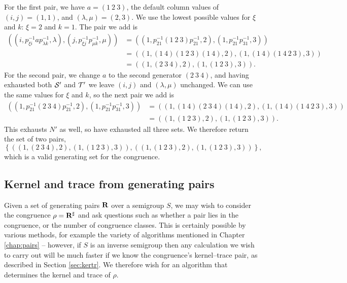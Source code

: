 \begin{example}
  For the first pair, we have $a = (1~2~3)$, the default column values of
  $(i,j)=(1,1)$, and $(\lambda,\mu)=(2,3)$.  We use the lowest possible values
  for $\xi$ and $k$: $\xi = 2$ and $k = 1$.  The pair we add is
  \begin{align*}
    \left(
      (i, p_{\xi i}^{-1}ap_{\lambda k}^{-1}, \lambda),
      (j, p_{\xi j}^{-1}p_{\mu k}^{-1}, \mu)
    \right)
    &= \left(
      (1, p_{2 1}^{-1}(1~2~3)p_{2 1}^{-1}, 2),
      (1, p_{2 1}^{-1}p_{3 1}^{-1}, 3)
    \right) \\
    &= \left(
      \left(1, (1~4)(1~2~3)(1~4), 2\right),
      \left(1, (1~4)(1~4~2~3), 3\right)
    \right) \\
    &= \left(
      \left(1, (2~3~4), 2\right),
      \left(1, (1~2~3), 3\right)
    \right).
  \end{align*}
  For the second pair, we change $a$ to the second generator $(2~3~4)$, and
  having exhausted both $\mathcal{S}'$ and $\mathcal{T}'$ we leave $(i,j)$ and $(\lambda,\mu)$
  unchanged.  We can use the same values for $\xi$ and $k$, so the next pair we
  add is
  \begin{align*}
    \left(
      (1, p_{2 1}^{-1}(2~3~4)p_{2 1}^{-1}, 2),
      (1, p_{2 1}^{-1}p_{3 1}^{-1}, 3)
    \right)
    &= \left(
      \left(1, (1~4)(2~3~4)(1~4), 2\right),
      \left(1, (1~4)(1~4~2~3), 3\right)
    \right) \\
    &= \left(
      \left(1, (1~2~3), 2\right),
      \left(1, (1~2~3), 3\right)
    \right).
  \end{align*}
  This exhausts $N'$ as well, so have exhausted all three sets.  We therefore
  return the set of two pairs,
  $$\left\{
    \left(
      \left(1, (2~3~4), 2\right),
      \left(1, (1~2~3), 3\right)
    \right),
    \left(
      \left(1, (1~2~3), 2\right),
      \left(1, (1~2~3), 3\right)
    \right)
  \right\},$$
  which is a valid generating set for the congruence.
\end{example}

\subsection{Kernel and trace from generating pairs}
\label{sec:pairs-to-kertr}

Given a set of generating pairs $\mathbf{R}$ over a semigroup $S$, we may wish
to consider the congruence $\rho = \mathbf{R}^\sharp$ and ask questions such as
whether a pair lies in the congruence, or the number of congruence classes.
This is certainly possible by various methods, for example the variety of
algorithms mentioned in Chapter \ref{chap:pairs} -- however, if $S$ is an inverse
semigroup then any calculation we wish to carry out will be much faster if we
know the congruence's kernel--trace pair, as described in Section
\ref{sec:kertr}.  We therefore wish for an algorithm that determines the kernel
and trace of $\rho$.

